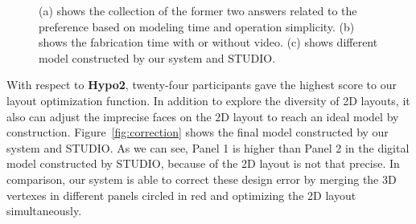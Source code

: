 \begin{figure}
	\centering
	\vspace{-1ex}
	\vspace{-1ex}
	\caption{(a) shows the collection of the former two answers related to the preference based on modeling time and operation simplicity. (b) shows the fabrication time with or without video. (c) shows different model constructed by our system and STUDIO. }
	\label{fig:userstudy}
\end{figure}

With respect to \textbf{Hypo2}, twenty-four participants gave the highest score to our layout optimization function. 
%
In addition to explore the diversity of 2D layouts, it also can adjust the imprecise faces on the 2D layout to reach an ideal model by construction. Figure~\ref{fig:correction} shows the final model constructed by our system and STUDIO. As we can see, Panel 1 is higher than Panel 2 in the digital model constructed by STUDIO, because of the 2D layout is not that precise. 
%
In comparison, our system is able to correct these design error by merging the 3D vertexes in different panels circled in red and optimizing the 2D layout simultaneously.



